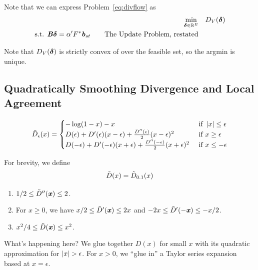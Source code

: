 Note that we can express Problem~\eqref{eq:divflow} as
\begin{align}
   \label{eq:divflow2}
  \min_{\boldsymbol{\delta} \in \mathbb{R}^E} & \quad 
      D_V( \boldsymbol{\delta} )
  \\
  \textrm{s.t. }  \boldsymbol{\mathit{B}}\boldsymbol{\delta} = \alpha' F^* \boldsymbol{\mathit{b}}_{st}
\tag*{The Update Problem, restated}
\end{align}

Note that  $D_V( \boldsymbol{\delta} )$ is strictly convex of over the
feasible set, so the argmin is unique.

\subsection{Quadratically Smoothing Divergence and Local Agreement}

\[
  \tilde{D}_{\epsilon}(x) =
  \begin{cases}
    -\log(1-x) - x & \text{ if } \left|x \right| \leq \epsilon \\
    D(\epsilon) + D'(\epsilon) (x - \epsilon) 
    +\frac{D''(\epsilon)}{2} (x - \epsilon)^2
    & \text{ if }  x \geq \epsilon \\
    D(-\epsilon) + D'(-\epsilon) (x + \epsilon) 
    +\frac{D''(-\epsilon)}{2} (x +\epsilon)^2
    & \text{ if }  x \leq -\epsilon \\
  \end{cases}
\]

For brevity, we define
\[
  \tilde{D}(x) =\tilde{D}_{0.1}(x) 
\]
\begin{lemma}
  \label{lem:sdivderivs}
  \noindent
  \begin{enumerate}
  \item $1/2 \leq \tilde{D}''(\boldsymbol{\mathit{x}}) \leq 2$.
  \item For $x \geq 0$, we have $x/2 \leq \tilde{D}'(\boldsymbol{\mathit{x}}) \leq 2x$
and $-2x \leq \tilde{D}'(-\boldsymbol{\mathit{x}}) \leq -x/2$.
\item $x^2/4 \leq \tilde{D}(\boldsymbol{\mathit{x}}) \leq x^2$.
  \end{enumerate}
\end{lemma}

What's happening here? We glue together $D(x)$ for small $x$ with its
quadratic approximation for $\left|x \right| > \epsilon$.
For $x > 0$, we ``glue in'' a Taylor series expansion based at $x =
\epsilon$.

